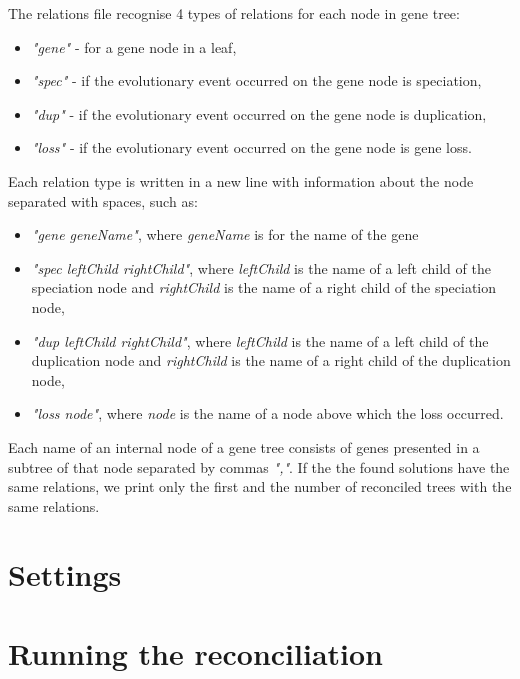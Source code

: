 The relations file recognise 4 types of relations for each node in gene tree:
\begin{itemize}
  \item \emph{"gene"} - for a gene node in a leaf,
  \item \emph{"spec"} - if the evolutionary event occurred on the gene node is speciation,
  \item \emph{"dup"} - if the evolutionary event occurred on the gene node is duplication,
  \item \emph{"loss"} - if the evolutionary event occurred on the gene node is gene loss.
\end{itemize}
Each relation type is written in a new line with information about the node separated with spaces, such as:
\begin{itemize}
  \item \emph{"gene geneName"}, where \emph{geneName} is for the name of the gene
  \item \emph{"spec leftChild rightChild"}, where \emph{leftChild} is the name of a left child of the speciation node and \emph{rightChild} is the name of a right child of the speciation node,
  \item \emph{"dup leftChild rightChild"}, where \emph{leftChild} is the name of a left child of the duplication node and \emph{rightChild} is the name of a right child of the duplication node,
  \item \emph{"loss node"}, where \emph{node} is the name of a node above which the loss occurred.
\end{itemize}
Each name of an internal node of a gene tree consists of genes presented in a subtree of that node separated by commas \emph{","}. If the the found solutions have the same relations, we print only the first and the number of reconciled trees with the same relations.

\section*{Settings}


\section*{Running the reconciliation}



